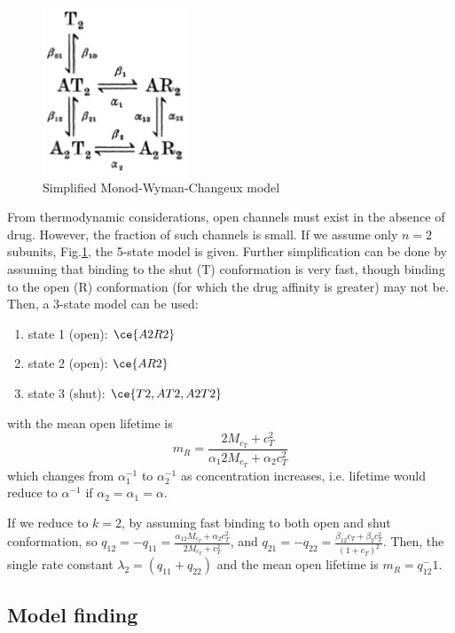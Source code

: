  \begin{figure}[hbt]
 \centerline{\includegraphics[height=5cm]{./images/MWC_model3.eps}}
\caption{Simplified Monod-Wyman-Changeux model}
\label{fig:simplified_MWC_model}
\end{figure}

From thermodynamic considerations, open channels must exist in the absence of
drug. However, the fraction of such channels is small. If we assume only
$n=2$ subunits, Fig.\ref{fig:simplified_MWC_model}, the 5-state model is given.
Further simplification can be done by assuming that binding to the shut (T)
conformation is very fast, though binding to the open (R) conformation (for
which the drug affinity is greater) may not be. Then, a 3-state model can be
used:
\begin{enumerate}
  \item state 1 (open): $\ce{A2R2}$
  \item state 2 (open): $\ce{AR2}$
  \item state 3 (shut): $\ce{T2,AT2,A2T2}$
\end{enumerate}
with the mean open lifetime is
\begin{equation}
m_R = \frac{2M_{c_T}+c^2_T}{\alpha_1 2M_{c_T}+\alpha_2c^2_T}
\end{equation}
which changes from $\alpha_1^{-1}$ to $\alpha_2^{-1}$ as concentration
increases, i.e. lifetime would reduce to $\alpha^{-1}$ if
$\alpha_2=\alpha_1=\alpha$.

If we reduce to $k=2$, by assuming fast binding to both open and shut
conformation, so
$q_{12}=-q_{11}=\frac{\alpha_12M_{c_T}+\alpha_2c^2_T}{2M_{c_T}+c^2_T}$, and
$q_{21}=-q_{22}=\frac{\beta_12c_T+\beta_2c^2_T}{(1+c_T)^2}$. Then, the single
rate constant $\lambda_2=(q_{11}+q_{22})$ and the mean open lifetime is
$m_R=q_{12}^-1$.



\subsection{Model finding}
\label{sec:model-finding}

